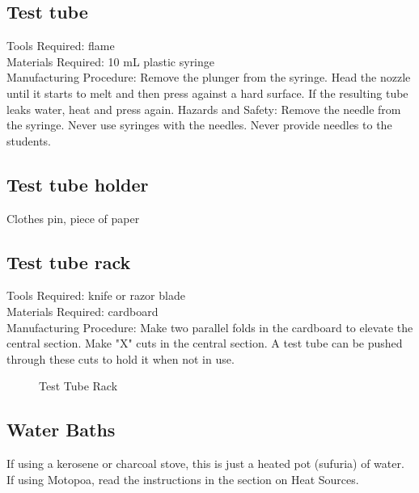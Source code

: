 \subsection*{Test tube}
Tools Required: flame\\
Materials Required: 10 mL plastic syringe\\
Manufacturing Procedure: Remove the plunger from the syringe. Head the nozzle until it starts to melt and then press against a hard surface. If the resulting tube leaks water, heat and press again.
Hazards and Safety: Remove the needle from the syringe. Never use syringes with the needles. Never provide needles to the students.

\subsection*{Test tube holder}
Clothes pin, piece of paper

\subsection*{Test tube rack}
Tools Required: knife or razor blade\\
Materials Required: cardboard\\
Manufacturing Procedure: Make two parallel folds in the cardboard to elevate the central section. Make "X" cuts in the central section. A test tube can be pushed through these cuts to hold it when not in use.

\begin{figure}[h]
\begin{center}
\def\svgwidth{150pt}

\caption{Test Tube Rack}
\end{center}
\end{figure}

\subsection*{Water Baths}
If using a kerosene or charcoal stove, this is just a heated pot (sufuria) of water. If using Motopoa, read the instructions in the section on Heat Sources.

